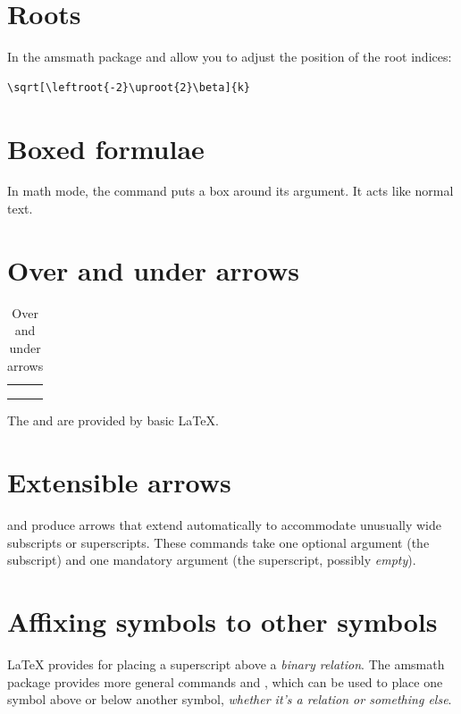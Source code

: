 \documentclass[a4paper,oneside]{book}
\newcommand{\package}[1]{\textsf{#1}}
\newcommand{\command}[1]{\PVerb{#1}}
\begin{document}
\section{Roots}
In the \package{amsmath} package \command{\leftroot} and \command{\uproot} allow you to adjust the position of the root indices:
\begin{lstlisting}
\sqrt[\leftroot{-2}\uproot{2}\beta]{k}
\end{lstlisting}

\section{Boxed formulae}
In math mode, the command \command{\boxed} puts a box around its argument. It acts like \command{\fbox} normal text.

\section{Over and under arrows}
\begin{table}[htpb]
  \centering
  \begin{tabular}{ll}
    \command{\overleftarrow}&\command{\underleftarrow}\\
    \command{\overrightarrow}&\command{\underrightarrow}\\
    \command{\overleftrightarrow}&\command{\underleftrightarrow}
  \end{tabular}
  \caption{Over and under arrows}
\end{table}
The \command{\overleftarrow} and \command{\overrightarrow} are provided by basic \LaTeX{}.

\section{Extensible arrows}
\command{\xleftarrow} and \command{\xrightarrow} produce arrows that extend automatically to accommodate unusually wide subscripts or superscripts. These commands take one optional argument (the subscript) and one mandatory argument (the superscript, possibly \emph{empty}).

\section{Affixing symbols to other symbols}
\LaTeX{} provides \command{\stackrel} for placing a superscript above a \emph{binary relation}. The \package{amsmath} package provides more general commands \command{\overset} and \command{\underset}, which can be used to place one symbol above or below another symbol, \emph{whether it’s a relation or something else}.
\end{document}
